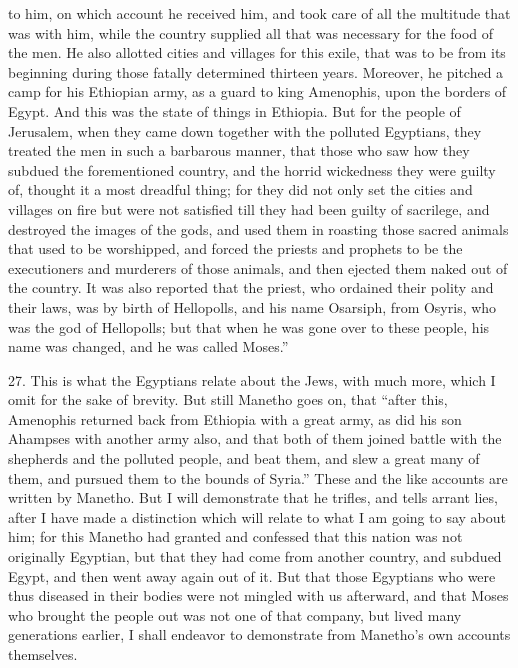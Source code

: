 to him, on which account he received him, and took care of all the
multitude that was with him, while the country supplied all that was
necessary for the food of the men. He also allotted cities and villages
for this exile, that was to be from its beginning during those fatally
determined thirteen years. Moreover, he pitched a camp for his Ethiopian
army, as a guard to king Amenophis, upon the borders of Egypt. And this
was the state of things in Ethiopia. But for the people of Jerusalem, when
they came down together with the polluted Egyptians, they treated the men
in such a barbarous manner, that those who saw how they subdued the
forementioned country, and the horrid wickedness they were guilty of,
thought it a most dreadful thing; for they did not only set the cities and
villages on fire but were not satisfied till they had been guilty of
sacrilege, and destroyed the images of the gods, and used them in roasting
those sacred animals that used to be worshipped, and forced the priests
and prophets to be the executioners and murderers of those animals, and
then ejected them naked out of the country. It was also reported that the
priest, who ordained their polity and their laws, was by birth of
Hellopolls, and his name Osarsiph, from Osyris, who was the god of
Hellopolls; but that when he was gone over to these people, his name was
changed, and he was called Moses.''

27. This is what the Egyptians relate about the Jews, with much more,
which I omit for the sake of brevity. But still Manetho goes on, that
``after this, Amenophis returned back from Ethiopia with a great army, as
did his son Ahampses with another army also, and that both of them joined
battle with the shepherds and the polluted people, and beat them, and slew
a great many of them, and pursued them to the bounds of Syria.'' These and
the like accounts are written by Manetho. But I will demonstrate that he
trifles, and tells arrant lies, after I have made a distinction which will
relate to what I am going to say about him; for this Manetho had granted
and confessed that this nation was not originally Egyptian, but that they
had come from another country, and subdued Egypt, and then went away again
out of it. But that those Egyptians who were thus diseased in their bodies
were not mingled with us afterward, and that Moses who brought the people
out was not one of that company, but lived many generations earlier, I
shall endeavor to demonstrate from Manetho's own accounts themselves.

